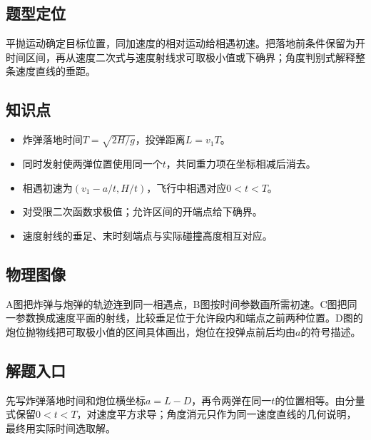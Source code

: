 \documentclass[UTF8,fontset=fandol,a4paper,11pt]{ctexart}
\begin{document}
\subsection*{题型定位}

平抛运动确定目标位置，同加速度的相对运动给相遇初速。把落地前条件保留为开时间区间，再从速度二次式与速度射线求可取极小值或下确界；角度判别式解释整条速度直线的垂距。



\subsection*{知识点}

\begin{itemize}
\item 炸弹落地时间$T=\sqrt{2H/g}$，投弹距离$L=v_1T$。
\item 同时发射使两弹位置使用同一个$t$，共同重力项在坐标相减后消去。
\item 相遇初速为$(v_1-a/t,H/t)$，飞行中相遇对应$0<t<T$。
\item 对受限二次函数求极值；允许区间的开端点给下确界。
\item 速度射线的垂足、末时刻端点与实际碰撞高度相互对应。\end{itemize}



\subsection*{物理图像}

A图把炸弹与炮弹的轨迹连到同一相遇点，B图按时间参数画所需初速。C图把同一参数换成速度平面的射线，比较垂足位于允许段内和端点之前两种位置。D图的炮位抛物线把可取极小值的区间具体画出，炮位在投弹点前后均由$a$的符号描述。



\subsection*{解题入口}

先写炸弹落地时间和炮位横坐标$a=L-D$，再令两弹在同一$t$的位置相等。由分量式保留$0<t<T$，对速度平方求导；角度消元只作为同一速度直线的几何说明，最终用实际时间选取解。
\end{document}
